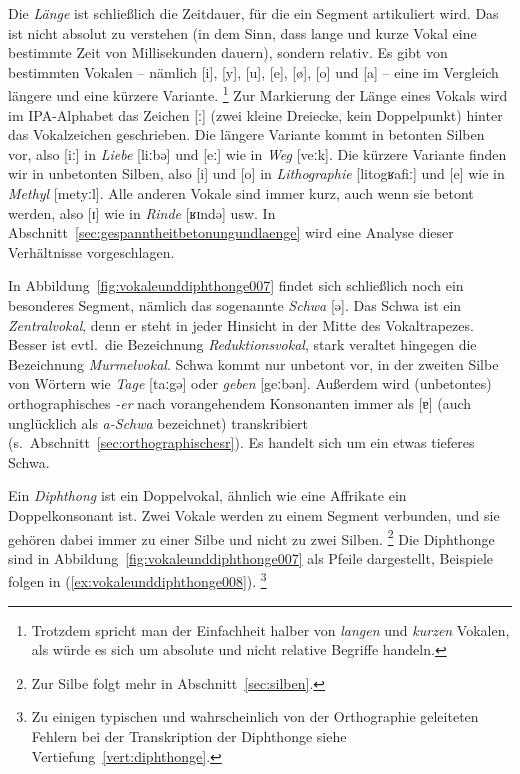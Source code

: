 Die \textit{Länge} ist schließlich die Zeitdauer, für die ein Segment artikuliert wird.
Das ist nicht absolut zu verstehen (in dem Sinn, dass lange und kurze Vokal eine bestimmte Zeit von Millisekunden dauern), sondern relativ.
Es gibt von bestimmten Vokalen -- nämlich [i], [y], [u], [e], [ø], [o] und [a] -- eine im Vergleich längere und eine kürzere Variante.%
\footnote{Trotzdem spricht man der Einfachheit halber von \textit{langen} und \textit{kurzen} Vokalen, als würde es sich um absolute und nicht relative Begriffe handeln.}
Zur Markierung der Länge eines Vokals wird im IPA-Alphabet das Zeichen [ː] (zwei kleine Dreiecke, kein Doppelpunkt) hinter das Vokalzeichen geschrieben.
Die längere Variante kommt in betonten Silben vor, also [iː] in \textit{Liebe} [liːbə] und [eː] wie in \textit{Weg} [veːk].
Die kürzere Variante finden wir in unbetonten Silben, also [i] und [o] in \textit{Lithographie} \mbox{[litogʁafiː]} und [e] wie in \textit{Methyl} \mbox{[metyːl]}.
Alle anderen Vokale sind immer kurz, auch wenn sie betont werden, also [ɪ] wie in \textit{Rinde} [ʁɪndə] usw.
In Abschnitt~\ref{sec:gespanntheitbetonungundlaenge} wird eine Analyse dieser Verhältnisse vorgeschlagen.

In Abbildung~\ref{fig:vokaleunddiphthonge007} findet sich schließlich noch ein besonderes Segment, nämlich das sogenannte \textit{Schwa} [ə].
Das Schwa ist ein \textit{Zentralvokal}, denn er steht in jeder Hinsicht in der Mitte des Vokaltrapezes.
Besser ist evtl.\ die Bezeichnung \textit{Reduktionsvokal}, stark veraltet hingegen die Bezeichnung \textit{Murmelvokal}.
Schwa kommt nur unbetont vor, \zB in der zweiten Silbe von Wörtern wie \textit{Tage} [taːgə] oder \textit{geben} [geːbən].
Außerdem wird (unbetontes) orthographisches \textit{-er} nach vorangehendem Konsonanten immer als [ɐ] (auch unglücklich als \textit{a-Schwa} bezeichnet) transkribiert (s.\ Abschnitt~\ref{sec:orthographischesr}).
Es handelt sich um ein etwas tieferes Schwa.

Ein \textit{Diphthong} ist ein Doppelvokal, ähnlich wie eine Affrikate ein Doppelkonsonant ist.
Zwei Vokale werden zu einem Segment verbunden, und sie gehören dabei immer zu einer Silbe und nicht zu zwei Silben.%
\footnote{Zur Silbe folgt mehr in Abschnitt~\ref{sec:silben}.}
Die Diphthonge sind in Abbildung~\ref{fig:vokaleunddiphthonge007} als Pfeile dargestellt, Beispiele folgen in (\ref{ex:vokaleunddiphthonge008}).%
\footnote{Zu einigen typischen und wahrscheinlich von der Orthographie geleiteten Fehlern bei der Transkription der Diphthonge siehe Vertiefung~\ref{vert:diphthonge}.}

